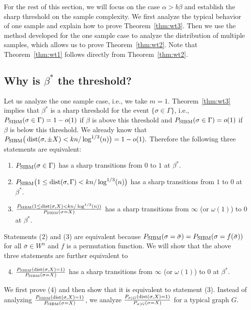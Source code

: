 \documentclass{article}
\begin{document}
For the rest of this section, we will focus on the case $\alpha>b\beta$ and establish the sharp threshold on the sample complexity. We first analyze the typical behavior of one sample and explain how to prove Theorem~\ref{thm:wt3}. Then we use the method developed for the one sample case to analyze the distribution of multiple samples, which allows us to prove Theorem~\ref{thm:wt2}. Note that Theorem~\ref{thm:wt1} follows directly from Theorem~\ref{thm:wt2}.

\subsection{Why is $\beta^\ast$ the threshold?} \label{sect:why}

Let us analyze the one sample case, i.e., we take $m=1$.
Theorem~\ref{thm:wt3} implies that $\beta^\ast$ is a sharp threshold for the event $\{\sigma \in \Gamma\}$, i.e., $P_{\operatorname{SIBM}}(\sigma\in \Gamma)=1-o(1)$ if $\beta$ is above this threshold and $P_{\operatorname{SIBM}}(\sigma\in \Gamma)=o(1)$ if $\beta$ is below this threshold.
We already know that
$
P_{\operatorname{SIBM}} \big(\operatorname{dist}(\sigma,\pm X)< kn/\log^{1/3}(n) \big) = 1- o(1) .
$
Therefore the following three statements are equivalent:
\begin{enumerate}[label=(\arabic*)]
\item $P_{\operatorname{SIBM}}(\sigma\in \Gamma)$ has a sharp transitions from $0$ to $1$ at $\beta^\ast$.
\item $P_{\operatorname{SIBM}} \big( 1\le \operatorname{dist}(\sigma,\Gamma)< kn/\log^{1/3}(n) \big)$ has a sharp transitions from $1$ to $0$ at $\beta^\ast$.
\item $\frac{P_{\operatorname{SIBM}} ( 1\le \operatorname{dist}(\sigma, X)< kn/\log^{1/3}(n) )}{P_{\operatorname{SIBM}}(\sigma= X)}$ has a sharp transitions from $\infty$ (or $\omega(1)$) to $0$ at $\beta^\ast$.
\end{enumerate}
Statements (2) and (3) are equivalent because $P_{\operatorname{SIBM}}(\sigma=\bar{\sigma})=P_{\operatorname{SIBM}}(\sigma=f(\bar{\sigma}))$ for all $\bar{\sigma}\in W^n$ and $f$ is a permutation function.
We will show that the above three statements are further equivalent to
\begin{enumerate}[label=(\arabic*)]
\setcounter{enumi}{3}
  \item  $\frac{P_{\operatorname{SIBM}} ( \operatorname{dist}(\sigma, X) = 1 )}{P_{\operatorname{SIBM}}(\sigma= X)}$ has a sharp transitions from $\infty$ (or $\omega(1)$) to $0$ at $\beta^\ast$.
\end{enumerate}
We first prove (4) and then show that it is equivalent to statement (3).
Instead of analyzing $\frac{P_{\operatorname{SIBM}} ( \operatorname{dist}(\sigma, X) = 1 )}{P_{\operatorname{SIBM}}(\sigma= X)}$, we analyze $\frac{P_{\sigma|G} ( \operatorname{dist}(\sigma, X) = 1 )}{P_{\sigma|G}(\sigma= X)}$ for a typical graph $G$.
\end{document}
